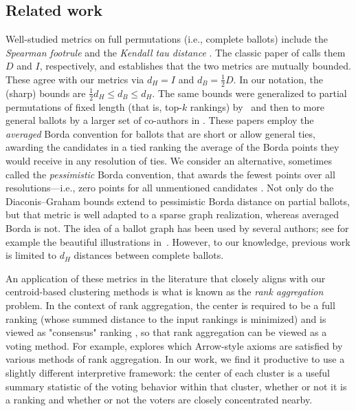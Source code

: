 \documentclass{amsart}
\theoremstyle{plain}
\theoremstyle{definition}
\theoremstyle{remark}
\begin{document}
\subsection{Related work}
Well-studied metrics on full permutations (i.e., complete ballots) include the {\em Spearman footrule}  and the {\em Kendall tau distance} 
\cite{Kendall_1970,Kendall_Gibbons_1990}.  
The classic paper of \citet{Diaconis_Graham_1977} calls them $D$ and $I$, respectively, and establishes that the two metrics are mutually bounded.
These agree with our metrics via $d_H=I$ and $d_B=\frac 12 D$.
In our notation, the (sharp) bounds are
$\frac 12 d_H \leq d_B \leq d_H.$
The same bounds were generalized to partial permutations of fixed length (that is, top-$k$ rankings) by~\citet{Fagin_Kumar_Sivakumar_2003} and then to more general ballots by a larger set of co-authors in \cite{Fagin_Kumar_Mahdian_Sivakumar_Vee_2006}.
These papers employ the \emph{averaged} Borda convention for ballots that are short or allow general ties, awarding the candidates in a tied ranking the average of the Borda points they would receive in any resolution of ties.  We consider an alternative, sometimes called the  
\emph{pessimistic} Borda convention, that awards the fewest points over all resolutions---i.e., zero points for all unmentioned candidates \cite{Kamwa_2022}.
Not only do the Diaconis--Graham bounds extend to pessimistic Borda distance on partial ballots, but that metric is well adapted to a sparse graph realization, whereas averaged Borda is not.  The idea of a ballot graph has been used by several authors; see for example the beautiful illustrations in~\cite{Puppe_2018}. However, to our knowledge, previous work is limited to $d_H$ distances between complete ballots.

An application of these metrics in the literature that closely aligns with our centroid-based clustering methods is what is known as the \emph{rank aggregation} problem.  In the context of rank aggregation, the center is required to be a full ranking (whose summed distance to the input rankings is minimized) and is viewed as "consensus" ranking \cite{Dwork2001RankAggregation,Van_Zuylen_Williamson_2009}, so that rank aggregation can be viewed as a voting method.  For example, \cite{Fishburn_1977} explores which Arrow-style axioms are satisfied by various methods of rank aggregation.  In our work, we find it productive to use a slightly different interpretive framework: the center of each cluster is a useful summary statistic of the voting behavior within that cluster, whether or not it is a ranking and whether or not the voters are closely concentrated nearby.
\end{document}
